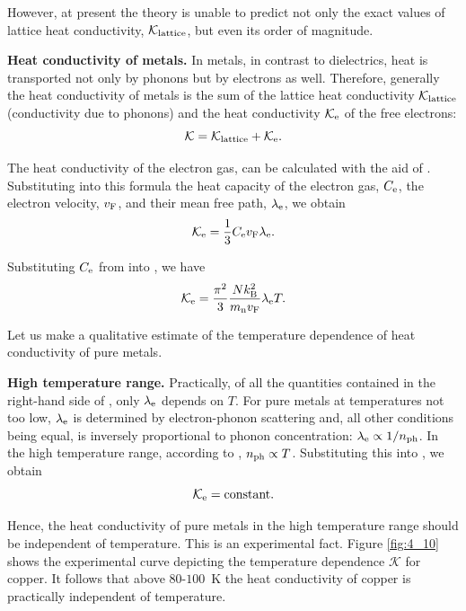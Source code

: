 However, at present the theory is unable to predict not only the exact values of lattice heat conductivity, $\mathcal{K}_{\text{lattice}}$, but even its order of magnitude.

\textbf{Heat conductivity of metals.} In metals, in contrast to dielectrics, heat is transported not only by phonons but by electrons as well. Therefore, generally the heat conductivity of metals is the sum of the lattice heat conductivity $\mathcal{K}_{\text{lattice}}$ (conductivity due to phonons) and the heat conductivity $\mathcal{K}_{\text{e}}$ of the free electrons:
\begin{equation*}
    \mathcal{K} = \mathcal{K}_{\text{lattice}} + \mathcal{K}_{\text{e}}.
\end{equation*}

The heat conductivity of the electron gas, can be calculated with the aid of . Substituting into this formula the heat capacity of the electron gas, $C_{\text{e}}$, the electron velocity, $v_{\text{F}}$, and their mean free path, $\lambda_{\text{e}}$, we obtain
\begin{equation}\label{eq:4_57}
    \mathcal{K}_{\text{e}} = \frac{1}{3} C_{\text{e}} v_{\text{F}} \lambda_{\text{e}}.
\end{equation}

\noindent
Substituting $C_{\text{e}}$ from  into , we have
\begin{equation}\label{eq:4_58}
    \mathcal{K}_{\text{e}} = \frac{\pi^2}{3} \frac{N k_{\text{B}}^2}{m_{\text{n}} v_{\text{F}}} \lambda_{\text{e}} T.
\end{equation}

Let us make a qualitative estimate of the temperature dependence of heat conductivity of pure metals.

\textbf{High temperature range.} Practically, of all the quantities contained in the right-hand side of , only $\lambda_{\text{e}}$ depends on $T$. For pure metals at temperatures not too low, $\lambda_{\text{e}}$ is determined by electron-phonon scattering and, all other conditions being equal, is inversely proportional to phonon concentration: $\lambda_{\text{e}}\propto 1/n_{\text{ph}}$. In the high temperature range, according to , $n_{\text{ph}}\propto T$. Substituting this into , we obtain
\begin{equation}\label{eq:4_59}
    \mathcal{K}_{\text{e}} = \text{constant}.
\end{equation}

\noindent
Hence, the heat conductivity of pure metals in the high temperature range should be independent of temperature. This is an experimental fact. Figure \ref{fig:4_10} shows the experimental curve depicting the temperature dependence $\mathcal{K}$ for copper. It follows that above $80$-$100$~K the heat conductivity of copper is practically independent of temperature.


